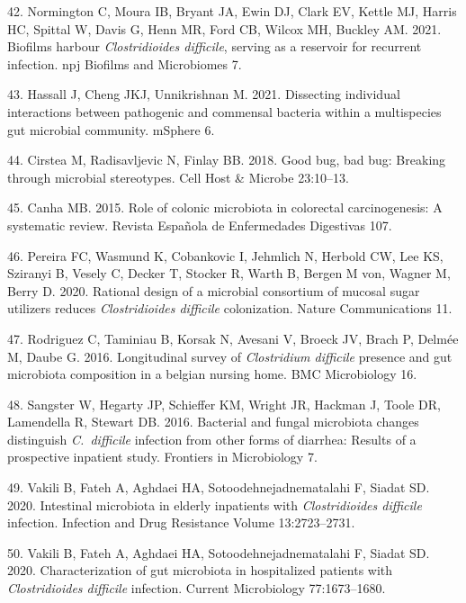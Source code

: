 \documentclass[
  11pt,
]{article}
\begin{document}
\leavevmode\hypertarget{ref-Normington2021}{}%
42. Normington C, Moura IB, Bryant JA, Ewin DJ, Clark EV, Kettle MJ,
Harris HC, Spittal W, Davis G, Henn MR, Ford CB, Wilcox MH, Buckley AM.
2021. Biofilms harbour \emph{Clostridioides difficile}, serving as a
reservoir for recurrent infection. npj Biofilms and Microbiomes 7.

\leavevmode\hypertarget{ref-Hassall2021}{}%
43. Hassall J, Cheng JKJ, Unnikrishnan M. 2021. Dissecting individual
interactions between pathogenic and commensal bacteria within a
multispecies gut microbial community. mSphere 6.

\leavevmode\hypertarget{ref-Cirstea2018}{}%
44. Cirstea M, Radisavljevic N, Finlay BB. 2018. Good bug, bad bug:
Breaking through microbial stereotypes. Cell Host \& Microbe 23:10--13.

\leavevmode\hypertarget{ref-BorgesCanha2015}{}%
45. Canha MB. 2015. Role of colonic microbiota in colorectal
carcinogenesis: A systematic review. Revista Española de Enfermedades
Digestivas 107.

\leavevmode\hypertarget{ref-Pereira2020}{}%
46. Pereira FC, Wasmund K, Cobankovic I, Jehmlich N, Herbold CW, Lee KS,
Sziranyi B, Vesely C, Decker T, Stocker R, Warth B, Bergen M von, Wagner
M, Berry D. 2020. Rational design of a microbial consortium of mucosal
sugar utilizers reduces \emph{Clostridioides difficile} colonization.
Nature Communications 11.

\leavevmode\hypertarget{ref-Rodriguez2016}{}%
47. Rodriguez C, Taminiau B, Korsak N, Avesani V, Broeck JV, Brach P,
Delmée M, Daube G. 2016. Longitudinal survey of \emph{Clostridium
difficile} presence and gut microbiota composition in a belgian nursing
home. BMC Microbiology 16.

\leavevmode\hypertarget{ref-Sangster2016}{}%
48. Sangster W, Hegarty JP, Schieffer KM, Wright JR, Hackman J, Toole
DR, Lamendella R, Stewart DB. 2016. Bacterial and fungal microbiota
changes distinguish \emph{C.~difficile} infection from other forms of
diarrhea: Results of a prospective inpatient study. Frontiers in
Microbiology 7.

\leavevmode\hypertarget{ref-Vakili2020a}{}%
49. Vakili B, Fateh A, Aghdaei HA, Sotoodehnejadnematalahi F, Siadat SD.
2020. Intestinal microbiota in elderly inpatients with
\emph{Clostridioides difficile} infection. Infection and Drug Resistance
Volume 13:2723--2731.

\leavevmode\hypertarget{ref-Vakili2020b}{}%
50. Vakili B, Fateh A, Aghdaei HA, Sotoodehnejadnematalahi F, Siadat SD.
2020. Characterization of gut microbiota in hospitalized patients with
\emph{Clostridioides difficile} infection. Current Microbiology
77:1673--1680.
\end{document}
